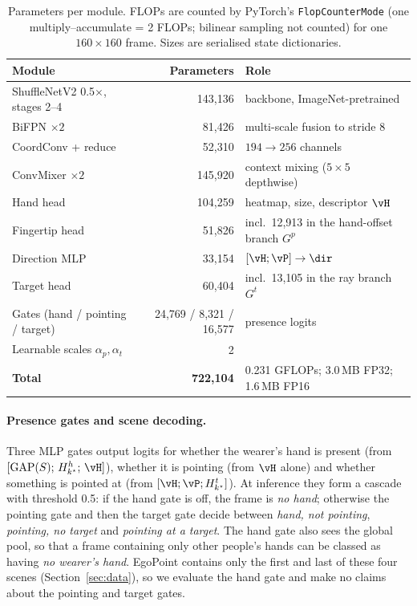 \begin{table}[h]
  \caption{Parameters per module. FLOPs are counted by PyTorch's \texttt{FlopCounterMode} (one multiply--accumulate = 2 FLOPs; bilinear sampling not counted) for one $160\times160$ frame. Sizes are serialised state dictionaries.}
  \label{tab:params}
  \small
  \begin{tabular}{lrl}
    \toprule
    Module & Parameters & Role \\
    \midrule
    ShuffleNetV2 0.5$\times$, stages 2--4 & 143,136 & backbone, ImageNet-pretrained \\
    BiFPN $\times2$ & 81,426 & multi-scale fusion to stride 8 \\
    CoordConv + reduce & 52,310 & $194\to256$ channels \\
    ConvMixer $\times2$ & 145,920 & context mixing ($5\times5$ depthwise) \\
    \midrule
    Hand head & 104,259 & heatmap, size, descriptor $\vH$ \\
    Fingertip head & 51,826 & incl.\ 12,913 in the hand-offset branch $G^p$ \\
    Direction MLP & 33,154 & $[\vH;\vP]\to\dir$ \\
    Target head & 60,404 & incl.\ 13,105 in the ray branch $G^t$ \\
    Gates (hand / pointing / target) & 24,769 / 8,321 / 16,577 & presence logits \\
    Learnable scales $\alpha_p,\alpha_t$ & 2 & \\
    \midrule
    \textbf{Total} & \textbf{722,104} & 0.231 GFLOPs; 3.0\,MB FP32; 1.6\,MB FP16 \\
    \bottomrule
  \end{tabular}
\end{table}

\paragraph{Presence gates and scene decoding.} Three MLP gates output logits for whether the wearer's hand is present (from $[\mathrm{GAP}(S);\,H^h_{k^\star};\,\vH]$), whether it is pointing (from $\vH$ alone) and whether something is pointed at (from $[\vH;\vP;H^t_{k^\star}]$). At inference they form a cascade with threshold 0.5: if the hand gate is off, the frame is \emph{no hand}; otherwise the pointing gate and then the target gate decide between \emph{hand, not pointing}, \emph{pointing, no target} and \emph{pointing at a target}. The hand gate also sees the global pool, so that a frame containing only other people's hands can be classed as having \emph{no wearer's hand}. EgoPoint contains only the first and last of these four scenes (Section~\ref{sec:data}), so we evaluate the hand gate and make no claims about the pointing and target gates.

